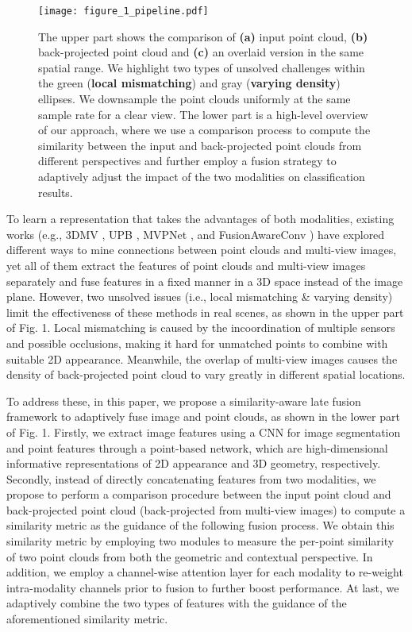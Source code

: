 \documentclass[letterpaper, 10 pt, conference]{ieeeconf}
\begin{document}
\begin{figure}[t]
\texttt{[image: figure\_1\_pipeline.pdf]}
\vspace{-7mm}
\caption{The upper part shows the comparison of \textbf{(a)} input point cloud, \textbf{(b)} back-projected point cloud and \textbf{(c)} an overlaid version in the same spatial range. We highlight two types of unsolved challenges within the green (\textbf{local mismatching}) and gray (\textbf{varying density}) ellipses. We downsample the point clouds uniformly at the same sample rate for a clear view.
The lower part is a high-level overview of our approach, where we use a comparison process to compute the similarity between the input and back-projected point clouds from different perspectives and further employ a fusion strategy to adaptively adjust the impact of the two modalities on classification results.} 
\vspace{-5mm}
\end{figure}




To learn a representation that takes the advantages of both modalities, 
existing works (e.g., 3DMV \cite{dai20183dmv}, UPB \cite{chiang2019unified}, MVPNet \cite{jaritz2019multi}, and FusionAwareConv \cite{zhang2020fusion}) have explored different ways to mine connections between point clouds and multi-view images, yet all of them extract the features of point clouds and multi-view images separately and fuse features in a fixed manner in a 3D space instead of the image plane. 
However, two unsolved issues (i.e., local mismatching \& varying density) limit the effectiveness of these methods in real scenes, as shown in the upper part of Fig. 1. 
Local mismatching is caused by the incoordination of multiple sensors and possible occlusions, making it hard for unmatched points to combine with suitable 2D appearance. 
Meanwhile, the overlap of multi-view images causes the density of back-projected point cloud to vary greatly in different spatial locations. 


To address these, in this paper, we propose a similarity-aware late fusion framework to adaptively fuse image and point clouds, as shown in the lower part of Fig. 1. 
Firstly, we extract image features using a CNN for image segmentation and point features through a point-based network, which are high-dimensional informative representations of 2D appearance and 3D geometry, respectively.
Secondly, instead of directly concatenating features from two modalities, we propose to perform a comparison procedure between the input point cloud and back-projected point cloud (back-projected from multi-view images) to compute a similarity metric as the guidance of the following fusion process. 
We obtain this similarity metric by employing two modules to measure the per-point similarity of two point clouds from both the geometric and contextual perspective.
In addition, we employ a channel-wise attention layer for each modality to re-weight intra-modality channels prior to fusion to further boost performance.
At last, we adaptively combine the two types of features with the guidance of the aforementioned similarity metric.
\end{document}
